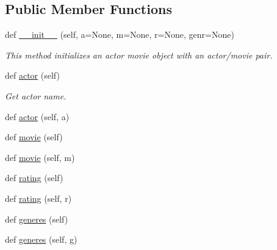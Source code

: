 \subsection*{Public Member Functions}
\begin{DoxyCompactItemize}
\item 
def \hyperlink{classbridges_1_1data__src__dependent_1_1actor__movie__imdb_1_1_actor_movie_i_m_d_b_add733f3ecfc9282d102cee6bf5e20674}{\+\_\+\+\_\+init\+\_\+\+\_\+} (self, a=None, m=None, r=None, genr=None)
\begin{DoxyCompactList}\small\item\em This method initializes an actor movie object with an actor/movie pair. \end{DoxyCompactList}\item 
def \hyperlink{classbridges_1_1data__src__dependent_1_1actor__movie__imdb_1_1_actor_movie_i_m_d_b_aff9f7941225e72653d26171a596c6ef7}{actor} (self)
\begin{DoxyCompactList}\small\item\em Get actor name. \end{DoxyCompactList}\item 
def \hyperlink{classbridges_1_1data__src__dependent_1_1actor__movie__imdb_1_1_actor_movie_i_m_d_b_a030a7f94d4cfc3a105f4e0218a382276}{actor} (self, a)
\item 
def \hyperlink{classbridges_1_1data__src__dependent_1_1actor__movie__imdb_1_1_actor_movie_i_m_d_b_a05c035927b682e537b0931a1951ac579}{movie} (self)
\item 
def \hyperlink{classbridges_1_1data__src__dependent_1_1actor__movie__imdb_1_1_actor_movie_i_m_d_b_acf1fb5f37a8fa19ee503b031a20638d5}{movie} (self, m)
\item 
def \hyperlink{classbridges_1_1data__src__dependent_1_1actor__movie__imdb_1_1_actor_movie_i_m_d_b_a38ab0b7ab41a2c2c31111264de3952cb}{rating} (self)
\item 
def \hyperlink{classbridges_1_1data__src__dependent_1_1actor__movie__imdb_1_1_actor_movie_i_m_d_b_a72585e9e7ad9d2d2409cbd4f6fb92fcc}{rating} (self, r)
\item 
def \hyperlink{classbridges_1_1data__src__dependent_1_1actor__movie__imdb_1_1_actor_movie_i_m_d_b_a4fcdcdeb2812b905c1e4f260833ddbf0}{generes} (self)
\item 
def \hyperlink{classbridges_1_1data__src__dependent_1_1actor__movie__imdb_1_1_actor_movie_i_m_d_b_acd36a6c77775745c7a5b56f33fa3e6f4}{generes} (self, g)
\end{DoxyCompactItemize}


